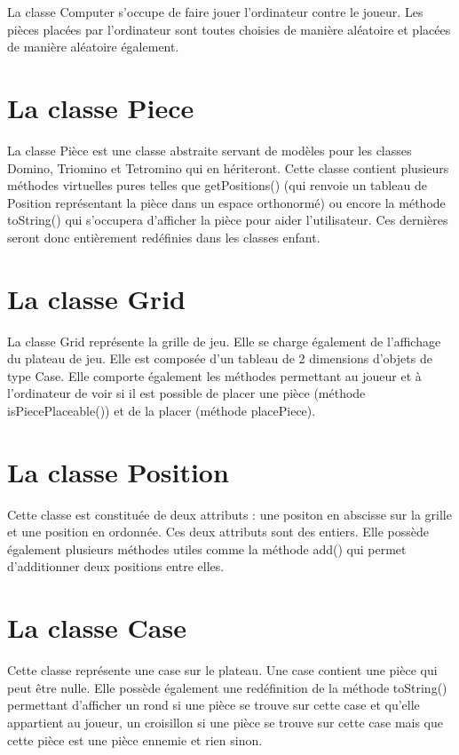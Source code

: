 \documentclass[a4paper, titlepage, french]{report}
\begin{document}
La classe Computer s'occupe de faire jouer l'ordinateur contre le joueur. Les pièces placées
par l'ordinateur sont toutes choisies de manière aléatoire et placées de manière aléatoire également.

\bigskip

\section{La classe Piece}

La classe Pièce est une classe abstraite servant de modèles pour les classes Domino, Triomino et Tetromino
qui en hériteront.
Cette classe contient plusieurs méthodes virtuelles pures telles que getPositions() (qui renvoie un tableau de Position représentant
la pièce dans un espace orthonormé) ou encore la méthode toString() qui s'occupera d'afficher la pièce pour aider
l'utilisateur. Ces dernières seront donc entièrement redéfinies dans les classes enfant.

\bigskip

\section{La classe Grid}

La classe Grid représente la grille de jeu. Elle se charge également de l'affichage du plateau de jeu.
Elle est composée d'un tableau de 2 dimensions d'objets de type Case.
Elle comporte également les méthodes permettant au joueur et à l'ordinateur de voir si il est possible de
placer une pièce (méthode isPiecePlaceable()) et de la placer (méthode placePiece).

\bigskip

\section{La classe Position}

Cette classe est constituée de deux attributs : une positon en abscisse sur la grille et une position en 
ordonnée. Ces deux attributs sont des entiers. 
Elle possède également plusieurs méthodes utiles comme la méthode add() qui permet d'additionner deux 
positions entre elles.

\bigskip

\section{La classe Case}

Cette classe représente une case sur le plateau. Une case contient une pièce qui peut être nulle.
Elle possède également une redéfinition de la méthode toString() permettant d'afficher 
un rond si une pièce se trouve sur cette case et qu'elle appartient au joueur, un croisillon si une 
pièce se trouve sur cette case mais que cette pièce est une pièce ennemie et rien sinon.
\end{document}
